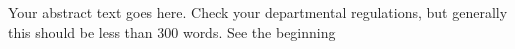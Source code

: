 Your abstract text goes here.  Check your departmental regulations, but generally this should be less than 300 words.  See the beginning 